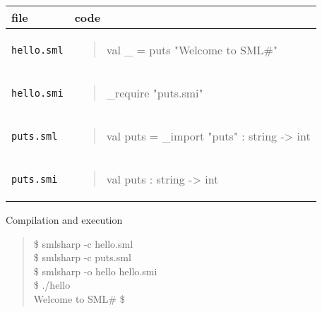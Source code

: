 \documentclass{jbook}
\newcommand{\code}[1]{\mbox{\large\tt #1}}
\newenvironment{program}{\begin{quote}\begin{tt}}%
                        {\end{tt}\end{quote}}
\begin{document}
\begin{itemize}
\begin{tabular}{|l|l|}
\hline
file & code
\\\hline
\hline
\begin{minipage}{0.5\textwidth}
\code{hello.sml}
\end{minipage}
&
\begin{minipage}{0.5\textwidth}
\begin{program}
val \_ = puts "Welcome to SML\#"
\end{program}
\end{minipage}
\\\hline
\begin{minipage}{0.5\textwidth}
\code{hello.smi}
\end{minipage}
&
\begin{minipage}{0.5\textwidth}
\begin{program}
\_require "puts.smi"
\end{program}
\end{minipage}
\\\hline
\begin{minipage}{0.5\textwidth}
\code{puts.sml}
\end{minipage}
&
\begin{minipage}{0.5\textwidth}
\begin{program}
val puts = \_import "puts" : string -> int
\end{program}
\end{minipage}
\\\hline
\begin{minipage}{0.5\textwidth}
\code{puts.smi}
\end{minipage}
&
\begin{minipage}{0.5\textwidth}
\begin{program}
val puts : string -> int
\end{program}
\end{minipage}
\\\hline
\end{tabular}


Compilation and execution
\begin{program}
 \$ smlsharp -c hello.sml\\
 \$ smlsharp -c puts.sml\\
 \$ smlsharp -o hello hello.smi\\
 \$ ./hello\\
  Welcome to SML\#
 \$
\end{program}
\end{itemize}
\fi%
\end{document}

